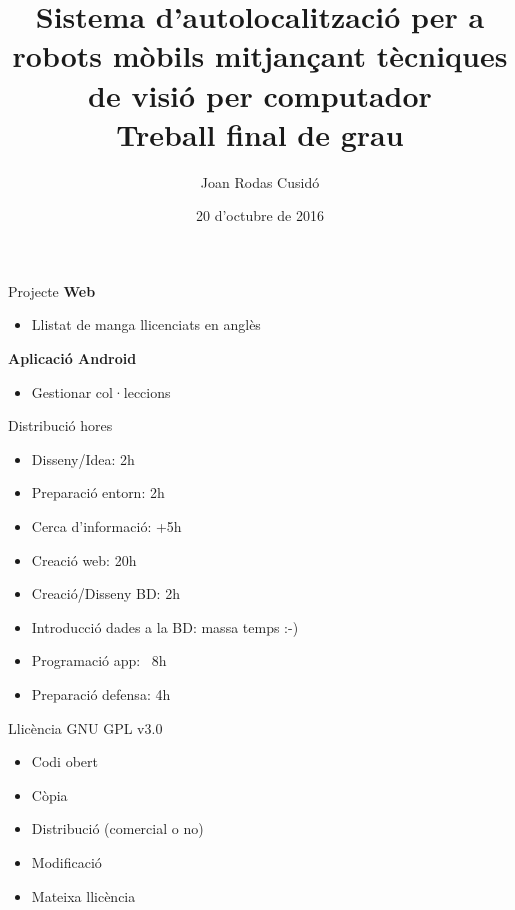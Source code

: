 \documentclass{beamer}
\title[TFG]{\Large{Sistema d'autolocalització per a robots mòbils mitjançant tècniques de visió per computador}\\\hspace{0.05cm}\large{Treball final de grau}}
\author{Joan Rodas Cusidó}
\institute{Facultat Informàtica de Barcelona\\Universitat Politècnica de Catalunya}
\date{20 d'octubre de 2016}
\begin{document}
	\begin{frame}[plain]
		\titlepage
	\end{frame}

	\begin{frame}{Projecte}
		\large\textbf{Web}
		\begin{itemize}
			\item Llistat de manga llicenciats en anglès
		\end{itemize}
			\vspace{1em}
			\large\textbf{Aplicació Android}
		\begin{itemize}
			\item Gestionar col·leccions
		\end{itemize}
	\end{frame}

	\begin{frame}{Distribució hores}
		\begin{itemize}
			\item Disseny/Idea: 2h
			\item Preparació entorn: 2h
			\item Cerca d'informació: +5h
			\item Creació web: 20h
			\item Creació/Disseny BD: 2h
			\item Introducció dades a la BD: massa temps :-)
			\item Programació app: ~8h
			\item Preparació defensa: 4h
		\end{itemize}
	\end{frame}

	\begin{frame}{Llicència}
		GNU GPL v3.0
		\begin{itemize}
			\item Codi obert
			\item Còpia
			\item Distribució (comercial o no)
			\item Modificació
			\item Mateixa llicència 
		\end{itemize}
	\end{frame}
\end{document}
